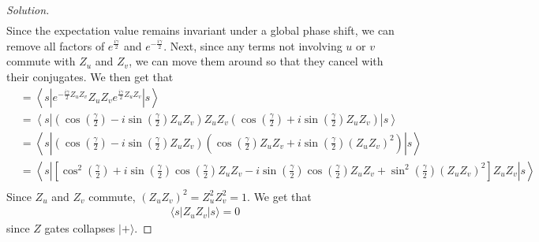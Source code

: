 \documentclass[11pt]{article}
\newenvironment{question}[2][Question]{\begin{trivlist}
\item[\hskip \labelsep {\bfseries #1}\hskip \labelsep {\bfseries #2.}]}{\end{trivlist}}
\newenvironment{solution}{\begin{proof}[Solution]}{\end{proof}}
\newcommand{\lr}[3]{\!\left#1 #3 \right#2}
\begin{document}
\begin{question}{2}
\begin{enumerate}[(a)]
\begin{solution}
\begin{align*}
                \end{align*}
                Since the expectation value remains invariant under a global phase shift, we can remove all factors of $e^{\frac{i\gamma}{2}}$ and $e^{-\frac{i\gamma}{2}}$. Next, since any terms not involving $u$ or $v$ commute with $Z_u$ and $Z_v$, we can move them around so that they cancel with their conjugates. We then get that
                \begin{align*}
                    &= \left\langle s\left|e^{-\frac{i\gamma}{2}Z_uZ_v }Z_uZ_v e^{\frac{i\gamma}{2}Z_uZ_v }\right|s\right\rangle \\
                    &= \left\langle s\left|\lr(){\cos\lr(){\frac{\gamma}{2}}-i\sin\lr(){\frac{\gamma}{2}}Z_uZ_v}Z_uZ_v \lr(){\cos\lr(){\frac{\gamma}{2}}+i\sin\lr(){\frac{\gamma}{2}}Z_uZ_v}\right|s\right\rangle \\
                    &= \left\langle s\left|\lr(){\cos\lr(){\frac{\gamma}{2}}-i\sin\lr(){\frac{\gamma}{2}}Z_uZ_v} \lr(){\cos\lr(){\frac{\gamma}{2}}Z_uZ_v+i\sin\lr(){\frac{\gamma}{2}}(Z_uZ_v)^2}\right|s\right\rangle \\
                    &= \lr\langle\rangle{s\lr||{\lr[]{\cos^2\lr(){\frac{\gamma}{2}}+i\sin\lr(){\frac{\gamma}{2}}\cos\lr(){\frac{\gamma}{2}}Z_uZ_v - i\sin\lr(){\frac{\gamma}{2}}\cos\lr(){\frac{\gamma}{2}}Z_uZ_v + \sin^2\lr(){\frac{\gamma}{2}}(Z_uZ_v)^2}Z_uZ_v}s} \\
                \end{align*}
                Since $Z_u$ and $Z_v$ commute, $(Z_uZ_v)^2 = Z_u^2Z_v^2=1$. We get that
                \begin{align*}
                    \langle s|Z_uZ_v|s\rangle = 0
                \end{align*}
                since $Z$ gates collapses $|+\rangle$.


\end{solution}
\end{enumerate}
\end{question}
\end{document}
